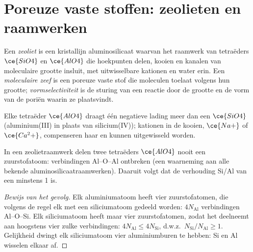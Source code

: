 \section{Poreuze vaste stoffen: zeolieten en raamwerken}

\begin{definition}[Zeolieten]\label{def:b3:inorganic-materials:zeolite}
Een \emph{zeoliet} is een kristallijn aluminosilicaat
waarvan het raamwerk van tetraëders $\ce{SiO4}$ en $\ce{AlO4}$ die hoekpunten delen, kooien en
kanalen van moleculaire grootte insluit, met uitwisselbare kationen en
water erin. Een
\emph{moleculaire zeef} is een poreuze vaste stof
die moleculen toelaat volgens hun grootte;
\emph{vormselectiviteit} is de sturing van een
reactie door de grootte en de vorm van de poriën waarin ze plaatsvindt.
\end{definition}

Elke tetraëder $\ce{AlO4}$ draagt één negatieve lading meer dan een $\ce{SiO4}$
(aluminium(III) in plaats van silicium(IV)); kationen in de kooien, $\ce{Na+}$ of $\ce{Ca^2+}$,
compenseren haar en kunnen uitgewisseld worden.

\begin{proposition}\label{prop:b3:inorganic-materials:lowenstein}
In een zeolietraamwerk delen twee tetraëders $\ce{AlO4}$ nooit een zuurstofatoom: verbindingen Al--O--Al
ontbreken (een waarneming aan alle bekende aluminosilicaatraamwerken).
Daaruit volgt dat de verhouding Si/Al van een  minstens 1 is.
\end{proposition}

\begin{proof}[Bewijs van het gevolg]
Elk aluminiumatoom heeft vier zuurstofatomen, die volgens de regel elk
met een siliciumatoom gedeeld worden:
$4N_{\mathrm{Al}}$ verbindingen Al--O--Si. Elk siliciumatoom heeft maar vier zuurstofatomen, zodat het deelneemt aan
hoogstens vier zulke verbindingen: $4N_{\mathrm{Al}} \le 4N_{\mathrm{Si}}$, d.w.z.\ $N_{\mathrm{Si}}/N_{\mathrm{Al}} \ge 1$. Gelijkheid dwingt elk
siliciumatoom vier aluminiumburen te hebben: Si en Al wisselen elkaar af.
\end{proof}

